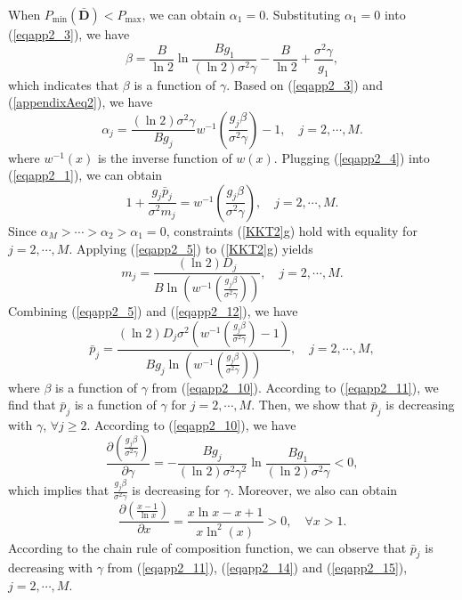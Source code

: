 \documentclass[journal]{IEEEtran}
\begin{document}
When $P_{\min}(\pmb {\bar D})<P_{\max}$, we can obtain $\alpha_1=0$.
Substituting $\alpha_1=0$ into (\ref{eqapp2_3}), we have
\begin{equation}\label{eqapp2_10}
\beta=\frac{B}{\ln2} \ln\frac{{B} g_1}{{(\ln2)}\sigma^2\gamma}
-\frac{B}{\ln2}+\frac{\sigma^2\gamma}{ g_1},
\end{equation}
which indicates that $\beta$ is a function of $\gamma$.
Based on (\ref{eqapp2_3}) and (\ref{appendixAeq2}), we have
\begin{equation}\label{eqapp2_4}
\alpha_j=\frac{{(\ln2)}\sigma^2\gamma}{{B}g_j} w^{-1}\left(\frac{g_j \beta }{\sigma^2 \gamma}\right)-1,\quad j=2, \cdots, M.
\end{equation}
where $w^{-1}(x)$ is the inverse function of $w(x)$.
Plugging (\ref{eqapp2_4}) into (\ref{eqapp2_1}), we can obtain
\begin{equation}\label{eqapp2_5}
1+\frac{g_j \bar p_j}{\sigma^2 m_j}=w^{-1}\left(\frac{g_j \beta }{\sigma^2 \gamma}\right), \quad j =2, \cdots, M.
\end{equation}
Since $\alpha_M>\cdots>\alpha_2>\alpha_1=0$, constraints (\ref{KKT2}g) hold with equality for $j=2, \cdots, M$.
Applying (\ref{eqapp2_5}) to (\ref{KKT2}g) yields
\begin{equation}\label{eqapp2_12}
m_j =\frac{{(\ln2)} D_j}{{B} \ln\left( w^{-1}\left(\frac{g_j \beta }{\sigma^2 \gamma}\right)\right)},\quad j =2 , \cdots, M.
\end{equation}
Combining (\ref{eqapp2_5}) and (\ref{eqapp2_12}), we have
\begin{equation}\label{eqapp2_11}
\bar p_j= \frac{{(\ln2)} D_j \sigma^2
\left(w^{-1}\left(\frac{g_j \beta }{\sigma^2 \gamma}\right)-1\right)
}{{B} g_j\ln\left( w^{-1}\left(\frac{g_j \beta }{\sigma^2 \gamma}\right)\right)}, \quad j =2 , \cdots, M,
\end{equation}
where $\beta$ is a function of $\gamma$ from (\ref{eqapp2_10}).
According to (\ref{eqapp2_11}), we find that $\bar p_j$ is a function of $\gamma$ for $j =2 , \cdots, M$.
Then, we show that $\bar p_j$ is decreasing with $\gamma$, $\forall j \geq 2$.
According to (\ref{eqapp2_10}), we have
\begin{equation}\label{eqapp2_14}
\frac{\partial \left(\frac{g_j \beta }{\sigma^2 \gamma}\right)}{\partial \gamma}
=-\frac{B g_j}{(\ln2)\sigma^2 \gamma^2} \ln\frac{{B} g_1}{{(\ln2)}\sigma^2\gamma} <0,
\end{equation}
which implies that $\frac{g_j \beta }{\sigma^2 \gamma}$ is decreasing for $\gamma$.
Moreover, we also can obtain
\begin{equation}\label{eqapp2_15}
\frac{\partial \left(\frac{x-1}{ \ln x }\right)}{\partial x}
= \frac{x \ln x -x +1}
{x\ln^2(x)} >0, \quad \forall x>1.
\end{equation}
According to the chain rule of composition function, we can observe that $\bar p_j$ is decreasing with $\gamma$ from (\ref{eqapp2_11}), (\ref{eqapp2_14}) and (\ref{eqapp2_15}), $j =2 , \cdots, M$.
\end{document}

